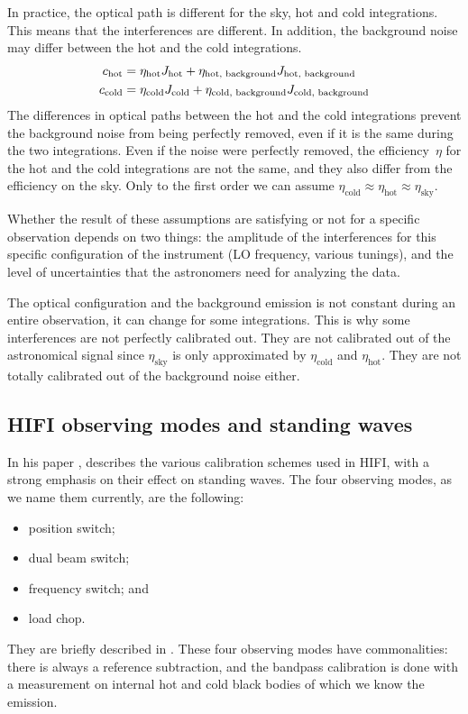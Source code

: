 In practice, the optical path is different for the sky, hot and cold integrations.
This means that the interferences are different.
In addition, the background noise may differ between the hot and the cold integrations.
\begin{align}
    c_\text{hot}  &= \eta_\text{hot} J_\text{hot} + \eta_\text{hot, background} J_\text{hot, background} \notag
    \\
    c_\text{cold} &= \eta_\text{cold} J_\text{cold} + \eta_\text{cold, background} J_\text{cold, background} \notag \label{eq:real_calibration_loads}
\end{align}
The differences in optical paths between the hot and the cold integrations prevent the background noise from being perfectly removed, even if it is the same during the two integrations.
Even if the noise were perfectly removed, the efficiency~$\eta$ for the hot and the cold integrations are not the same, and they also differ from the efficiency on the sky.
Only to the first order we can assume $\eta_\text{cold} \approx \eta_\text{hot} \approx \eta_\text{sky}$.

Whether the result of these assumptions are satisfying or not for a specific observation depends on two things: the amplitude of the interferences for this specific configuration of the instrument (LO frequency, various tunings), and the level of uncertainties that the astronomers need for analyzing the data.

The optical configuration and the background emission is not constant during an entire observation, it can change for some integrations.
This is why some interferences are not perfectly calibrated out.
They are not calibrated out of the astronomical signal since $\eta_\text{sky}$ is only approximated by $\eta_\text{cold}$ and $\eta_\text{hot}$.
They are not totally calibrated out of the background noise either.

\subsection{HIFI observing modes and standing waves}
In his paper  \cite{ossenkopf2002intensity}, \citeauthor{ossenkopf2002intensity} describes the various calibration schemes used in HIFI, with a strong emphasis on their effect on standing waves.
The four observing modes, as we name them currently, are the following:
\begin{itemize}
    \item position switch;
    \item dual beam switch;
    \item frequency switch; and
    \item load chop.
\end{itemize}
They are briefly described in  \cite{AA_537_A17}.
These four observing modes have commonalities: there is always a reference subtraction, and the bandpass calibration is done with a measurement on internal hot and cold black bodies of which we know the emission.

